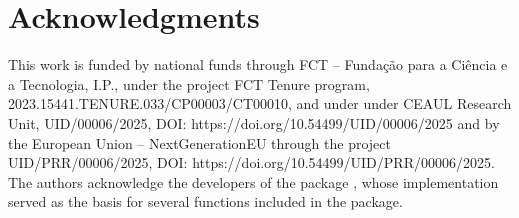 \hypertarget{Acknowledgments}{%
\section*{Acknowledgments}}
This work is funded by national funds through FCT – Fundação para a Ciência e a Tecnologia, I.P., under the project FCT Tenure program, 2023.15441.TENURE.033/CP00003/CT00010, and under under CEAUL Research Unit, UID/00006/2025, DOI: https://doi.org/10.54499/UID/00006/2025  and by the European Union – NextGenerationEU through the project UID/PRR/00006/2025, DOI: https://doi.org/10.54499/UID/PRR/00006/2025.\\

The authors acknowledge the developers of the  package \citep{Klau2018prioritylasso,klau2017prioritylasso}, whose implementation served as the basis for several functions included in the  package.



\address{%
Laila Musib\\
Faculdade de Ciências da Universidade de Lisboa \\%
Centro de Estatística e  Aplicações da Universidade de Lisboa (CEAUL)\\%
Campo Grande 016, 1749-016 Lisboa, Portugal\\%
}

\address{%
Helena Mouriño\\
Faculdade de Ciências da Universidade de Lisboa \\%
Centro de Estatística e  Aplicações da Universidade de Lisboa (CEAUL)\\%
Campo Grande 016, 1749-016 Lisboa, Portugal\\%
}

\address{
Eunice Carrasquinha\\
Faculdade de Ciências da Universidade de Lisboa \\%
Centro de Estatística e  Aplicações da Universidade de Lisboa (CEAUL)\\%
Campo Grande 016, 1749-016 Lisboa, Portugal\\%
}
